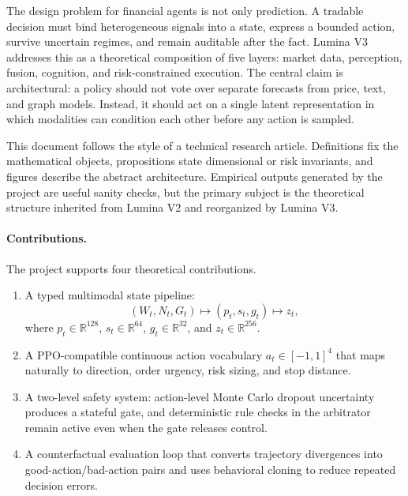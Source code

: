 \documentclass[10pt]{article}
\newcommand{\R}{\mathbb{R}}
\begin{document}
The design problem for financial agents is not only prediction. A tradable decision must
bind heterogeneous signals into a state, express a bounded action, survive uncertain regimes,
and remain auditable after the fact. Lumina V3 addresses this as a theoretical composition of
five layers: market data, perception, fusion, cognition, and risk-constrained execution. The
central claim is architectural: a policy should not vote over separate forecasts from price,
text, and graph models. Instead, it should act on a single latent representation in which
modalities can condition each other before any action is sampled.

This document follows the style of a technical research article. Definitions fix the
mathematical objects, propositions state dimensional or risk invariants, and figures describe
the abstract architecture. Empirical outputs generated by the project are useful sanity
checks, but the primary subject is the theoretical structure inherited from Lumina V2 and
reorganized by Lumina V3.

\paragraph{Contributions.}
The project supports four theoretical contributions.

\begin{enumerate}
	\item A typed multimodal state pipeline:
	      \[
		      (W_t, N_t, G_t) \mapsto (p_t,s_t,g_t) \mapsto z_t,
	      \]
	      where \(p_t\in\R^{128}\), \(s_t\in\R^{64}\), \(g_t\in\R^{32}\),
	      and \(z_t\in\R^{256}\).

	\item A PPO-compatible continuous action vocabulary
	      \(a_t\in[-1,1]^4\) that maps naturally to direction, order urgency, risk sizing, and stop
	      distance.

	\item A two-level safety system: action-level Monte Carlo dropout uncertainty produces a
	      stateful gate, and deterministic rule checks in the arbitrator remain active even when the
	      gate releases control.

	\item A counterfactual evaluation loop that converts trajectory divergences into
	      good-action/bad-action pairs and uses behavioral cloning to reduce repeated decision
	      errors.
\end{enumerate}
\end{document}
